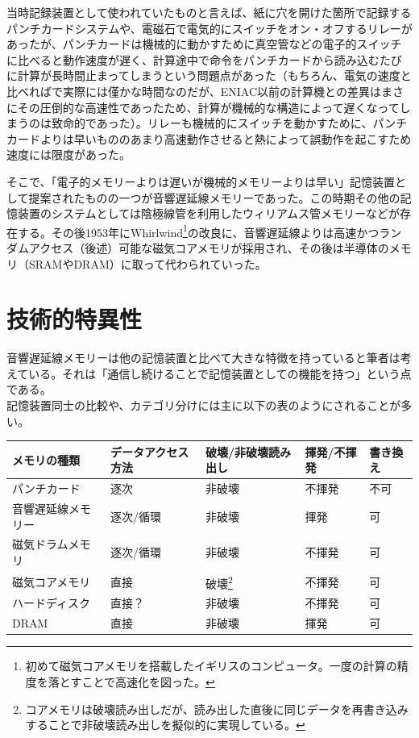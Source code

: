 \documentclass[a4paper,report]{jsbook}
\begin{document}
当時記録装置として使われていたものと言えば、紙に穴を開けた箇所で記録するパンチカードシステムや、電磁石で電気的にスイッチをオン・オフするリレーがあったが、パンチカードは機械的に動かすために真空管などの電子的スイッチに比べると動作速度が遅く、計算途中で命令をパンチカードから読み込むたびに計算が長時間止まってしまうという問題点があった（もちろん、電気の速度と比べればで実際には僅かな時間なのだが、ENIAC以前の計算機との差異はまさにその圧倒的な高速性であったため、計算が機械的な構造によって遅くなってしまうのは致命的であった）。リレーも機械的にスイッチを動かすために、パンチカードよりは早いもののあまり高速動作させると熱によって誤動作を起こすため速度には限度があった。

そこで、「電子的メモリーよりは遅いが機械的メモリーよりは早い」記憶装置として提案されたものの一つが音響遅延線メモリーであった。この時期その他の記憶装置のシステムとしては陰極線管を利用したウィリアムス管メモリーなどが存在する\autocite{invent_computer}。その後1953年にWhirlwind\footnote{初めて磁気コアメモリを搭載したイギリスのコンピュータ。一度の計算の精度を落とすことで高速化を図った。}の改良に、音響遅延線よりは高速かつランダムアクセス（後述）可能な磁気コアメモリが採用され、その後は半導体のメモリ（SRAMやDRAM）に取って代わられていった。

\section{技術的特異性}\label{ux6280ux8853ux7684ux7279ux7570ux6027}

音響遅延線メモリーは他の記憶装置と比べて大きな特徴を持っていると筆者は考えている。それは「通信し続けることで記憶装置としての機能を持つ」という点である。\\
記憶装置同士の比較や、カテゴリ分けには主に以下の表のようにされることが多い。

\begin{longtable}[]{@{}lllll@{}}
\toprule
メモリの種類 & データアクセス方法 & 破壊/非破壊読み出し & 揮発/不揮発 &
書き換え\tabularnewline
\midrule
\endhead
パンチカード & 逐次 & 非破壊 & 不揮発 & 不可\tabularnewline
音響遅延線メモリー & 逐次/循環 & 非破壊 & 揮発 & 可\tabularnewline
磁気ドラムメモリ & 逐次/循環 & 非破壊 & 不揮発 & 可\tabularnewline
磁気コアメモリ & 直接 & 破壊\footnote{コアメモリは破壊読み出しだが、読み出した直後に同じデータを再書き込みすることで非破壊読み出しを擬似的に実現している。}
& 不揮発 & 可\tabularnewline
ハードディスク & 直接？ & 非破壊 & 不揮発 & 可\tabularnewline
DRAM & 直接 & 非破壊 & 揮発 & 可\tabularnewline
\bottomrule
\end{longtable}
\end{document}
